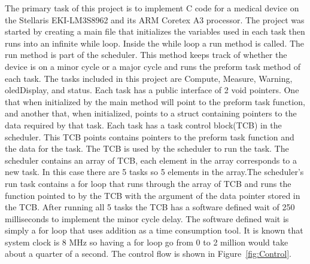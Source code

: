 \documentclass[12pt]{article} %
\begin{document}
The primary task of this project is to implement C code for a medical device on
the Stellaris EKI-LM3S8962 and its ARM Coretex A3 processor. The project was
started by creating a main file that initializes the variables used in each
task then runs into an infinite while loop. Inside the while loop a run method
is called. The run method is part of the scheduler. This method keeps track of
whether the device is on a minor cycle or a major cycle and runs the preform
task method of each task. The tasks included in this project are Compute,
Measure, Warning, oledDisplay, and status. Each task has a public interface of
2 void pointers. One that when initialized by the main method will point to the
preform task function, and another that, when initialized, points to a struct
containing pointers to the data required by that task. Each task has a task
control block(TCB) in the scheduler. This TCB points contains pointers to the
preform task function and the data for the task. The TCB is used by the
scheduler to run the task. The scheduler contains an array of TCB, each element
in the array corresponds to a new task. In this case there are 5 tasks so 5
elements in the array.The scheduler's run task contains a for loop that runs
through the array of TCB and runs the function pointed to by the TCB with the
argument of the data pointer stored in the TCB. After running all 5 tasks the
TCB has a software defined wait of 250 milliseconds to implement the minor
cycle delay. The software defined wait is simply a for loop that uses addition
as a time consumption tool. It is known that system clock is 8 MHz so having a
for loop go from 0 to 2 million would take about a quarter of a second. The
control flow is shown in Figure~\ref{fig:Control}. 
\end{document}
